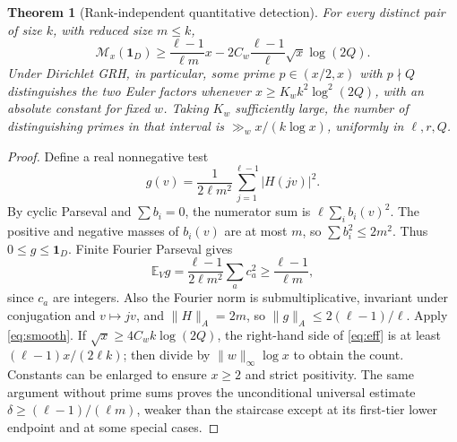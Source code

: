 \documentclass[11pt]{article}
\newtheorem{theorem}{Theorem}[section]
\theoremstyle{remark}\newtheorem{remark}[theorem]{Remark}
\newcommand{\E}{\mathbb E}
\newcommand{\norm}[1]{\lVert#1\rVert}
\newcommand{\ind}{\mathbf 1}
\begin{document}
\begin{theorem}[Rank-independent quantitative detection]\label{thm:effective}
For every distinct pair of size $k$, with reduced size $m\le k$,
\begin{equation}\label{eq:eff}
 \mathcal M_x(\ind_D)\ge \frac{\ell-1}{\ell m}x-2C_w\frac{\ell-1}{\ell}\sqrt x\log(2Q).
\end{equation}
Under Dirichlet GRH, in particular, some prime $p\in(x/2,x)$ with $p\nmid Q$ distinguishes the two Euler factors whenever $x\ge K_w k^2\log^2(2Q)$, with an absolute constant for fixed $w$. Taking $K_w$ sufficiently large, the number of distinguishing primes in that interval is $\gg_w x/(k\log x)$, uniformly in $\ell,r,Q$.
\end{theorem}
\begin{proof}
Define a real nonnegative test
\[
 g(v)=\frac1{2\ell m^2}\sum_{j=1}^{\ell-1}|H(jv)|^2.
\]
By cyclic Parseval and $\sum b_i=0$, the numerator sum is $\ell\sum_i b_i(v)^2$. The positive and negative masses of $b_i(v)$ are at most $m$, so $\sum b_i^2\le2m^2$. Thus $0\le g\le\ind_D$. Finite Fourier Parseval gives
\[
 \E_Vg=\frac{\ell-1}{2\ell m^2}\sum_a c_a^2\ge\frac{\ell-1}{\ell m},
\]
since $c_a$ are integers. Also the Fourier norm is submultiplicative, invariant under conjugation and $v\mapsto jv$, and $\norm H_A=2m$, so $\norm g_A\le2(\ell-1)/\ell$. Apply \eqref{eq:smooth}. If $\sqrt x\ge4C_w k\log(2Q)$, the right-hand side of \eqref{eq:eff} is at least $(\ell-1)x/(2\ell k)$; then divide by $\|w\|_\infty\log x$ to obtain the count. Constants can be enlarged to ensure $x\ge2$ and strict positivity. The same argument without prime sums proves the unconditional universal estimate $\delta\ge(\ell-1)/(\ell m)$, weaker than the staircase except at its first-tier lower endpoint and at some special cases.
\end{proof}
\end{document}
